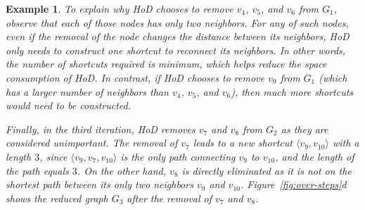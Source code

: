 \documentclass{sig-alternate}
\newtheorem{example} {Example}
\def\vgap{\vspace{0mm}}
\def\r{\alpha}
\begin{document}
\begin{sloppy}
\begin{example}
To explain why HoD chooses to remove $v_4$, $v_5$, and $v_6$ from $G_1$, observe that each of those nodes has only two neighbors. For any of such nodes, even if the removal of the node changes the distance between its neighbors, HoD only needs to construct one shortcut to reconnect its neighbors. In other words, the number of shortcuts required is minimum, which helps reduce the space consumption of HoD. In contrast, if HoD chooses to remove $v_9$ from $G_1$ (which has a larger number of neighbors than $v_4$, $v_5$, and $v_6$), then much more shortcuts would need to be constructed.

%
%


\vgap

Finally, in the third iteration, HoD removes $v_7$ and $v_8$ from $G_2$ as they are considered unimportant. The removal of $v_7$ leads to a new shortcut $\langle v_9, v_{10}\rangle$ with a length $3$, since $\langle v_9, v_7, v_{10}\rangle$ is the only path connecting $v_9$ to $v_{10}$, and the length of the path equals $3$. On the other hand, $v_8$ is directly eliminated as it is not on the shortest path between its only two neighbors $v_9$ and $v_{10}$. Figure~\ref{fig:over-steps}d shows the reduced graph $G_3$ after the removal of $v_7$ and $v_8$.


\end{example}
\end{sloppy}
\end{document}
